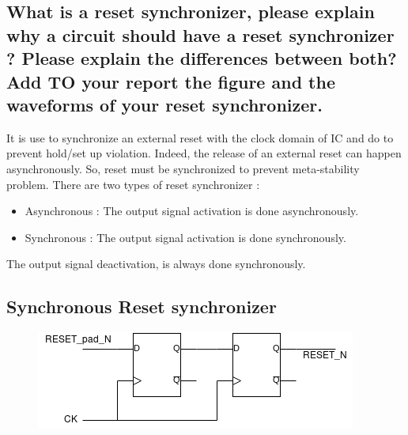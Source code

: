 \documentclass[11pt,a4paper,sans,dvipsnames]{report}
\begin{document}
	\begin{figure}[h!]
		\centering
		
		\label{fig:sync_synchronizer}
	\end{figure}

	\newpage
	\subsection*{
		What is a reset synchronizer, please explain why a circuit should have a reset synchronizer ?
		Please explain the differences between both?
		Add TO your report the figure and the waveforms of your reset synchronizer.
	}
	It is use to synchronize an external reset with the clock domain of IC and do to prevent hold/set up violation.
	Indeed, the release of an external reset can happen asynchronously. So, reset must be synchronized to prevent meta-stability problem.
	There are two types of reset synchronizer : \\
	\begin{itemize}
		\item Asynchronous : The output signal activation is done asynchronously.
		\item Synchronous : The output signal activation is done synchronously.
	\end{itemize}
	The output signal deactivation, is always done synchronously.\\

	\subsection*{Synchronous Reset synchronizer}
	\begin{figure}[h!]
		\centering
		\includegraphics[width=0.65\linewidth]{images/sync_reset_sync.png}
		\label{fig:sync_synchronizer}
	\end{figure}

	\begin{figure}[h!]
		\centering
		
		\label{fig:sync_synchronizer_code}
	\end{figure}
\end{document}
